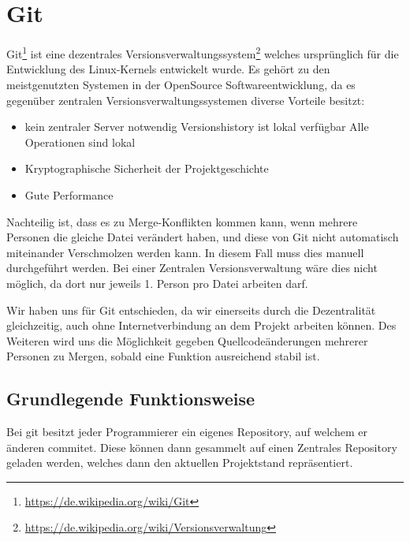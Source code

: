 

\section{Git}

Git\footnote{\url{https://de.wikipedia.org/wiki/Git}} ist eine dezentrales Versionsverwaltungssystem\footnote{\url{https://de.wikipedia.org/wiki/Versionsverwaltung}} welches urspr\"unglich f\"ur die Entwicklung des Linux-Kernels entwickelt wurde. Es geh\"ort zu den meistgenutzten Systemen in der OpenSource Softwareentwicklung, da es gegen\"uber zentralen Versionsverwaltungssystemen diverse Vorteile besitzt:

\begin{itemize}
  \item kein zentraler Server notwendig
  \subitem Versionshistory ist lokal verf\"ugbar
  \subitem Alle Operationen sind lokal
  \item Kryptographische Sicherheit der Projektgeschichte
  \item Gute Performance
\end{itemize}

Nachteilig ist, dass es zu Merge-Konflikten kommen kann, wenn mehrere Personen die gleiche Datei ver\"andert haben, und diese von Git nicht automatisch miteinander Verschmolzen werden kann. In diesem Fall muss dies manuell durchgef\"uhrt werden. Bei einer Zentralen Versionsverwaltung w\"are dies nicht m\"oglich, da dort nur jeweils 1. Person pro Datei arbeiten darf.

Wir haben uns f\"ur Git entschieden, da wir einerseits durch die Dezentralit\"at gleichzeitig, auch ohne Internetverbindung an dem Projekt arbeiten k\"onnen. Des Weiteren wird uns die M\"oglichkeit gegeben Quellcode\"anderungen mehrerer Personen zu Mergen, sobald eine Funktion ausreichend stabil ist.

\subsection{Grundlegende Funktionsweise}

Bei git besitzt jeder Programmierer ein eigenes Repository, auf welchem er \"anderen commitet. Diese k\"onnen dann gesammelt auf einen Zentrales Repository geladen werden, welches dann den aktuellen Projektstand repr\"asentiert.

